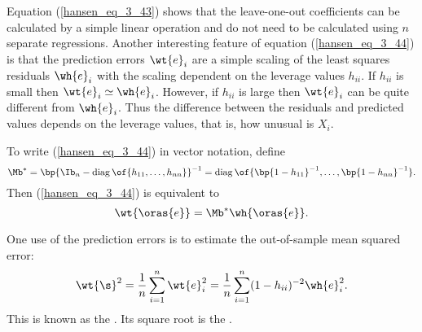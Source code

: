 Equation (\ref{hansen_eq_3_43}) shows that the leave-one-out coefficients can be calculated by a simple linear operation and do not need to be calculated using $n$ separate regressions. Another interesting feature of equation (\ref{hansen_eq_3_44}) is that the prediction errors $\wt{e}_i$ are a simple scaling of the least squares residuals $\wh{e}_i$ with the scaling dependent on the leverage values $h_{ii}$. If $h_{ii}$ is small then $\wt{e}_i \simeq \wh{e}_i$. However, if $h_{ii}$ is large then $\wt{e}_i$ can be quite different from $\wh{e}_i$. Thus the difference between the residuals and predicted values depends on the leverage values, that is, how unusual is $X_i$.

To write (\ref{hansen_eq_3_44}) in vector notation, define
\begin{equation}
    \notag
    \Mb^* = \bp{\Ib_n - \operatorname*{diag}\of{h_{11}, \ldots, h_{nn}}}^{-1} = \operatorname*{diag}\of{\bp{1-h_{11}}^{-1}, \ldots, \bp{1-h_{nn}}^{-1}}.
\end{equation}
Then (\ref{hansen_eq_3_44}) is equivalent to 
\begin{equation}
    \label{hansen_eq_3_45}
    \wt{\oras{e}} = \Mb^* \wh{\oras{e}}.
\end{equation}

One use of the prediction errors is to estimate the out-of-sample mean squared error:
\begin{equation}
    \label{hansen_eq_3_46}
    \wt{\s}^2 = \frac{1}{n} \sum_{i=1}^{n} \wt{e}_i^2 = \frac{1}{n} \sum_{i=1}^{n} (1-h_{ii})^{-2} \wh{e}_i^2.
\end{equation}
This is known as the . Its square root is the .

